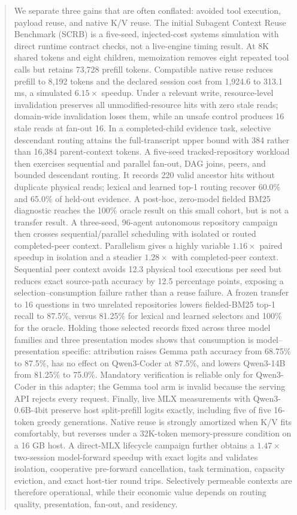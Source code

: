 \documentclass[11pt]{article}
\begin{document}
\begin{abstract}
We separate three gains that are often conflated: avoided tool execution,
payload reuse, and native K/V reuse. The initial Subagent Context Reuse
Benchmark (SCRB) is a five-seed, injected-cost systems simulation with direct
runtime contract checks, not a live-engine timing result. At 8K shared tokens
and eight children, memoization removes eight repeated tool calls but retains
73,728 prefill tokens. Compatible native reuse reduces prefill to 8,192 tokens
and the declared session cost from 1,924.6 to 313.1 ms, a simulated $6.15\times$
speedup. Under a relevant write, resource-level invalidation preserves all
unmodified-resource hits with zero stale reads; domain-wide invalidation loses
them, while an unsafe control produces 16 stale reads at fan-out 16. In a
completed-child evidence task, selective descendant routing attains the
full-transcript upper bound with 384 rather than 16,384 parent-context tokens.
A five-seed tracked-repository workload then exercises sequential and parallel
fan-out, DAG joins, peers, and bounded descendant routing. It records 220 valid
ancestor hits without duplicate physical reads; lexical and learned top-1
routing recover 60.0\% and 65.0\% of held-out evidence. A post-hoc, zero-model
fielded BM25 diagnostic reaches the 100\% oracle result on this small cohort,
but is not a transfer result. A three-seed, 96-agent autonomous repository
campaign then crosses sequential/parallel scheduling with isolated or routed
completed-peer context. Parallelism gives a highly variable $1.16\times$
paired speedup in isolation and a steadier $1.28\times$ with completed-peer
context. Sequential peer context avoids 12.3 physical tool executions per seed
but reduces exact source-path accuracy by 12.5 percentage points, exposing a
selection--consumption failure rather than a reuse failure. A frozen transfer
to 16 questions in two unrelated repositories lowers fielded-BM25 top-1 recall
to 87.5\%, versus 81.25\% for lexical and learned selectors and 100\% for the
oracle. Holding those selected records fixed across three model families and
three presentation modes shows that consumption is model--presentation
specific: attribution raises Gemma path accuracy from 68.75\% to 87.5\%, has
no effect on Qwen3-Coder at 87.5\%, and lowers Qwen3-14B from 81.25\% to
75.0\%. Mandatory verification is reliable only for Qwen3-Coder in this
adapter; the Gemma tool arm is invalid because the serving API rejects every
request. Finally, live MLX measurements with
Qwen3-0.6B-4bit preserve host split-prefill logits exactly, including five of
five 16-token greedy generations. Native reuse is strongly amortized when K/V
fits comfortably, but reverses under a 32K-token memory-pressure condition on
a 16 GB host. A direct-MLX lifecycle campaign further obtains a $1.47\times$
two-session model-forward speedup with exact logits and validates isolation,
cooperative pre-forward cancellation, task termination, capacity eviction,
and exact host-tier round trips. Selectively permeable contexts are therefore
operational, while their economic value depends on routing quality,
presentation, fan-out, and residency.
\end{abstract}
\end{document}
